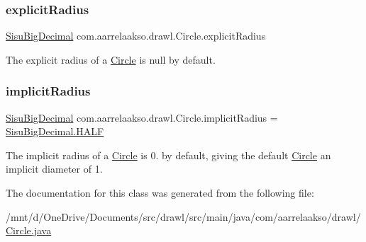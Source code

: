 \subsubsection{\texorpdfstring{explicit\+Radius}{explicitRadius}}
{\footnotesize\ttfamily \hyperlink{classcom_1_1aarrelaakso_1_1drawl_1_1_sisu_big_decimal}{Sisu\+Big\+Decimal} com.\+aarrelaakso.\+drawl.\+Circle.\+explicit\+Radius\hspace{0.3cm}{\ttfamily [private]}}

The explicit radius of a \hyperlink{classcom_1_1aarrelaakso_1_1drawl_1_1_circle}{Circle} is null by default. \mbox{\label{classcom_1_1aarrelaakso_1_1drawl_1_1_circle_a44419c5eba485de9b3dc2d8092be4e19}} 
\subsubsection{\texorpdfstring{implicit\+Radius}{implicitRadius}}
{\footnotesize\ttfamily \hyperlink{classcom_1_1aarrelaakso_1_1drawl_1_1_sisu_big_decimal}{Sisu\+Big\+Decimal} com.\+aarrelaakso.\+drawl.\+Circle.\+implicit\+Radius = \hyperlink{classcom_1_1aarrelaakso_1_1drawl_1_1_sisu_big_decimal_ae01ee6ac57cabf393e59465704a62f2c}{Sisu\+Big\+Decimal.\+H\+A\+LF}\hspace{0.3cm}{\ttfamily [private]}}

The implicit radius of a \hyperlink{classcom_1_1aarrelaakso_1_1drawl_1_1_circle}{Circle} is 0. by default, giving the default \hyperlink{classcom_1_1aarrelaakso_1_1drawl_1_1_circle}{Circle} an implicit diameter of 1. 

The documentation for this class was generated from the following file\+:\begin{DoxyCompactItemize}
\item 
/mnt/d/\+One\+Drive/\+Documents/src/drawl/src/main/java/com/aarrelaakso/drawl/\hyperlink{_circle_8java}{Circle.\+java}\end{DoxyCompactItemize}
